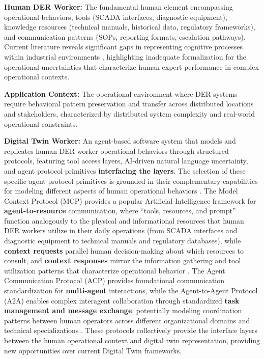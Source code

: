\documentclass[12pt,a4paper]{article}
\begin{document}
\textbf{Human DER Worker:} The fundamental human element encompassing operational behaviors, tools (SCADA interfaces, diagnostic equipment), knowledge resources (technical manuals, historical data, regulatory frameworks), and communication patterns (SOPs, reporting formats, escalation pathways). Current literature reveals significant gaps in representing cognitive processes within industrial environments \cite{10.1007/s44163-022-00020-w} \cite{10.1016/j.apergo.2018.07.016}, highlighting inadequate formalization for the operational uncertainties that characterize human expert performance in complex operational contexts.

\textbf{Application Context:} The operational environment where DER systems require behavioral pattern preservation and transfer across distributed locations and stakeholders, characterized by distributed system complexity and real-world operational constraints.

\textbf{Digital Twin Worker:} An agent-based software system that models and replicates human DER worker operational behaviors through structured protocols, featuring tool access layers, AI-driven natural language uncertainty, and agent protocol primitives \textbf{interfacing the layers}. The selection of these specific agent protocol primitives is grounded in their complementary capabilities for modeling different aspects of human operational behaviors \cite{2504.16736v2} \cite{2505.02279}. The Model Context Protocol (MCP) provides a popular Artificial Intelligence framework for \textbf{agent-to-resource} communication, where ``tools, resources, and prompt'' function analogously to the physical and informational resources that human DER workers utilize in their daily operations (from SCADA interfaces and diagnostic equipment to technical manuals and regulatory databases), while \textbf{context requests} parallel human decision-making about which resources to consult, and \textbf{context responses} mirror the information gathering and tool utilization patterns that characterize operational behavior \cite{2504.16736v2}. The Agent Communication Protocol (ACP) provides foundational communication standardization for \textbf{multi-agent} interactions, while the Agent-to-Agent Protocol (A2A) enables complex interagent collaboration through standardized \textbf{task management and message exchange}, potentially modeling coordination patterns between human operators across different organizational domains and technical specializations \cite{2505.02279}. These protocols collectively provide the interface layers between the human operational context and digital twin representation, providing new opportunities over current Digital Twin frameworks.
\end{document}
